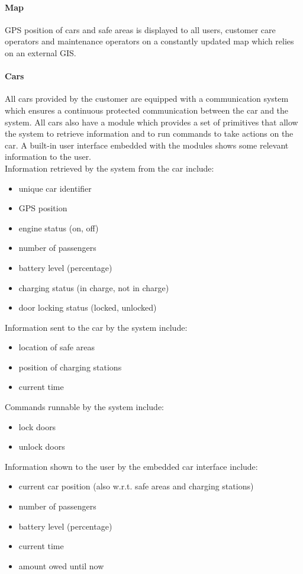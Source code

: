 	\paragraph{Map} GPS position of cars and safe areas is displayed to all users, customer care operators and maintenance operators on a constantly updated map which relies on an external GIS.

	\paragraph{Cars}\label{sec:cars}All cars provided by the customer are equipped with a communication system which ensures a continuous protected communication between the car and the system. All cars also have a module which provides a set of primitives that allow the system to retrieve information and to run commands to take actions on the car. A built-in user interface embedded with the modules shows some relevant information to the user.\\
	Information retrieved by the system from the car include:
	\begin{itemize}
		\item unique car identifier
		\item GPS position
		\item engine status (on, off)
		\item number of passengers
		\item battery level (percentage)
		\item charging status (in charge, not in charge)
		\item door locking status (locked, unlocked)
	\end{itemize}
	Information sent to the car by the system include:
	\begin{itemize}
		\item location of safe areas 
		\item position of charging stations
		\item current time
	\end{itemize}
	Commands runnable by the system include:
	\begin{itemize}
		\item lock doors
		\item unlock doors
	\end{itemize}		
	Information shown to the user by the embedded car interface include:
	\begin{itemize}
		\item current car position (also w.r.t. safe areas and charging stations)
		\item number of passengers
		\item battery level (percentage)
		\item current time
		\item amount owed until now
	\end{itemize}
	
